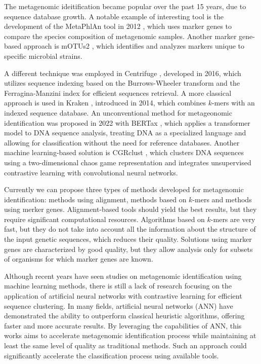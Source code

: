 \documentclass[pdflatex,sn-vancouver-num]{sn-jnl}%
\begin{document}
    The metagenomic ideitification became popular over the past 15 years, due to sequence database growth.
    A notable example of interesting tool is the development of the MetaPhlAn tool in 2012 \cite{Segata:2012}, which uses marker genes to compare the species composition of metagenomic samples.
    Another marker gene-based approach is mOTUs2 \cite{Milanese:2019}, which identifies and analyzes markers unique to specific microbial strains.

    A different technique was employed in Centrifuge \cite{Kim:2016}, developed in 2016,
    which utilizes sequence indexing based on the Burrows-Wheeler transform \cite{Burrows:1994} and the Ferragina-Manzini index \cite{Ferragina:2000} for efficient sequences retrieval.
    A more classical approach is used in Kraken \cite{Wood:2014}, introduced in 2014, which combines $k$-mers with an indexed sequence database.
    An unconventional method for metageonomic identification was proposed in 2022 with BERTax \cite{Mock:2022}, which applies a transformer model \cite{Transformers} to DNA sequence analysis,
    treating DNA as a specialized language and allowing for classification without the need for reference databases.
    Another machine learning-based solution is CGRclust \cite{Alipour:2024}, which clusters DNA sequences using a two-dimensional chaos game representation and integrates unsupervised contrastive learning with convolutional neural networks.

    Currently we can propose three types of methods developed for metagenomic identification: methods using alignment, methods based on $k$-mers and methods using merker genes.
    Alignment-based tools should yield the best results, but they require significant computational resources.
    Algorithms based on $k$-mers are very fast, but they do not take into account all the information about the structure of the input genetic sequences, which reduces their quality.
    Solutions using marker genes are characterized by good quality, but they allow analysis only for subsets of organisms for which marker genes are known.

    Although recent years have seen studies on metagenomic identification using machine learning methods, there is still
    a lack of research focusing on the application of artificial neural networks with contrastive learning for efficient sequence clustering.
    In many fields, artificial neural networks (ANN) have demonstrated the ability to outperform classical heuristic algorithms, offering faster and more accurate results.
    By leveraging the capabilities of ANN, this works aims to accelerate metagenomic identification process while maintaining at least the same level of quality as traditional methods.
    Such an approach could significantly accelerate the classification process using available tools.
\end{document}
